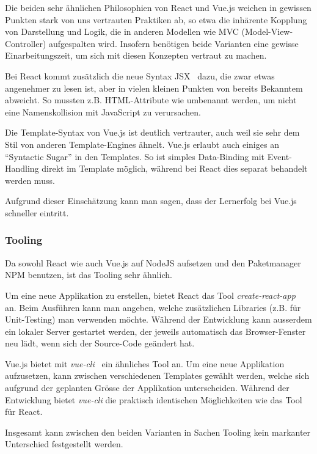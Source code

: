 Die beiden sehr ähnlichen Philosophien von React und Vue.js weichen in gewissen Punkten stark von uns vertrauten Praktiken ab, so etwa die inhärente Kopplung von Darstellung und Logik, die in anderen Modellen wie MVC (Model-View-Controller) aufgespalten wird.
Insofern benötigen beide Varianten eine gewisse Einarbeitungszeit, um sich mit diesen Konzepten vertraut zu machen.

Bei React kommt zusätzlich die neue Syntax JSX~\cite{jsx} dazu, die zwar etwas angenehmer zu lesen ist, aber in vielen kleinen Punkten von bereits Bekanntem abweicht.
So mussten z.B. HTML-Attribute wie  umbenannt werden, um nicht eine Namenskollision mit JavaScript zu verursachen.

Die Template-Syntax von Vue.js ist deutlich vertrauter, auch weil sie sehr dem Stil von anderen Template-Engines ähnelt.
Vue.js erlaubt auch einiges an "`Syntactic Sugar"' in den Templates.
So ist simples Data-Binding mit Event-Handling direkt im Template möglich, während bei React dies separat behandelt werden muss.

Aufgrund dieser Einschätzung kann man sagen, dass der Lernerfolg bei Vue.js schneller eintritt.

\subsubsection{Tooling}
\label{Analyse Framework:Tooling}

Da sowohl React wie auch Vue.js auf NodeJS aufsetzen und den Paketmanager NPM benutzen, ist das Tooling sehr ähnlich.

Um eine neue Applikation zu erstellen, bietet React das Tool \emph{create-react-app}~\cite{create_react_app} an.
Beim Ausführen kann man angeben, welche zusätzlichen Libraries (z.B. für Unit-Testing) man verwenden möchte.
Während der Entwicklung kann ausserdem ein lokaler Server gestartet werden, der jeweils automatisch das Browser-Fenster neu lädt, wenn sich der Source-Code geändert hat.

Vue.js bietet mit \emph{vue-cli}~\cite{vue_cli} ein ähnliches Tool an.
Um eine neue Applikation aufzusetzen, kann zwischen verschiedenen Templates gewählt werden, welche sich aufgrund der geplanten Grösse der Applikation unterscheiden.
Während der Entwicklung bietet \emph{vue-cli} die praktisch identischen Möglichkeiten wie das Tool für React.

Insgesamt kann zwischen den beiden Varianten in Sachen Tooling kein markanter Unterschied festgestellt werden.


